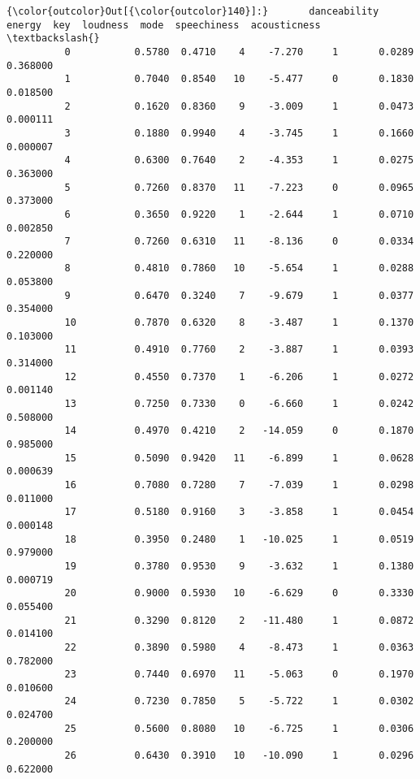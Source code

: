 \documentclass[11pt]{article}
\begin{document}
\begin{Verbatim}[commandchars=\\\{\}]
{\color{outcolor}Out[{\color{outcolor}140}]:}       danceability  energy  key  loudness  mode  speechiness  acousticness  \textbackslash{}
          0           0.5780  0.4710    4    -7.270     1       0.0289      0.368000   
          1           0.7040  0.8540   10    -5.477     0       0.1830      0.018500   
          2           0.1620  0.8360    9    -3.009     1       0.0473      0.000111   
          3           0.1880  0.9940    4    -3.745     1       0.1660      0.000007   
          4           0.6300  0.7640    2    -4.353     1       0.0275      0.363000   
          5           0.7260  0.8370   11    -7.223     0       0.0965      0.373000   
          6           0.3650  0.9220    1    -2.644     1       0.0710      0.002850   
          7           0.7260  0.6310   11    -8.136     0       0.0334      0.220000   
          8           0.4810  0.7860   10    -5.654     1       0.0288      0.053800   
          9           0.6470  0.3240    7    -9.679     1       0.0377      0.354000   
          10          0.7870  0.6320    8    -3.487     1       0.1370      0.103000   
          11          0.4910  0.7760    2    -3.887     1       0.0393      0.314000   
          12          0.4550  0.7370    1    -6.206     1       0.0272      0.001140   
          13          0.7250  0.7330    0    -6.660     1       0.0242      0.508000   
          14          0.4970  0.4210    2   -14.059     0       0.1870      0.985000   
          15          0.5090  0.9420   11    -6.899     1       0.0628      0.000639   
          16          0.7080  0.7280    7    -7.039     1       0.0298      0.011000   
          17          0.5180  0.9160    3    -3.858     1       0.0454      0.000148   
          18          0.3950  0.2480    1   -10.025     1       0.0519      0.979000   
          19          0.3780  0.9530    9    -3.632     1       0.1380      0.000719   
          20          0.9000  0.5930   10    -6.629     0       0.3330      0.055400   
          21          0.3290  0.8120    2   -11.480     1       0.0872      0.014100   
          22          0.3890  0.5980    4    -8.473     1       0.0363      0.782000   
          23          0.7440  0.6970   11    -5.063     0       0.1970      0.010600   
          24          0.7230  0.7850    5    -5.722     1       0.0302      0.024700   
          25          0.5600  0.8080   10    -6.725     1       0.0306      0.200000   
          26          0.6430  0.3910   10   -10.090     1       0.0296      0.622000   

\end{Verbatim}
\end{document}
